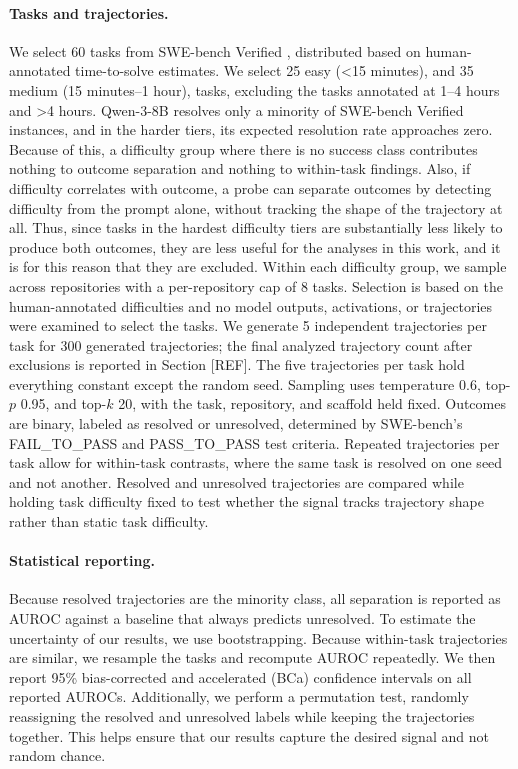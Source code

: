 \paragraph{Tasks and trajectories.} We select 60 tasks from SWE-bench Verified \citep{jimenez2024swebench}, distributed based on human-annotated time-to-solve estimates. We select 25 easy (<15 minutes), and 35 medium (15 minutes--1 hour), tasks,  excluding the tasks annotated at 1--4 hours and >4 hours. Qwen-3-8B resolves only a minority of SWE-bench Verified instances, and in the harder tiers, its expected resolution rate approaches zero. Because of this, a difficulty group where there is no success class contributes nothing to outcome separation and nothing to within-task findings. Also, if difficulty correlates with outcome, a probe can separate outcomes by detecting difficulty from the prompt alone, without tracking the shape of the trajectory at all. Thus, since tasks in the hardest difficulty tiers are substantially less likely to produce both outcomes, they are less useful for the analyses in this work, and it is for this reason that they are excluded. Within each difficulty group, we sample across repositories with a per-repository cap of 8 tasks. Selection is based on the human-annotated difficulties and no model outputs, activations, or trajectories were examined to select the tasks. We generate 5 independent trajectories per task for 300 generated trajectories; the final analyzed trajectory count after exclusions is reported in Section [REF]. The five trajectories per task hold everything constant except the random seed. Sampling uses temperature 0.6, top-$p$ 0.95, and top-$k$ 20, with the task, repository, and scaffold held fixed. Outcomes are binary, labeled as resolved or unresolved, determined by SWE-bench's FAIL\_TO\_PASS and PASS\_TO\_PASS test criteria. Repeated trajectories per task allow for within-task contrasts, where the same task is resolved on one seed and not another. Resolved and unresolved trajectories are compared while holding task difficulty fixed to test whether the signal tracks trajectory shape rather than static task difficulty.


\paragraph{Statistical reporting.} Because resolved trajectories are the minority class, all separation is reported as AUROC against a baseline that always predicts unresolved. To estimate the uncertainty of our results, we use bootstrapping. Because within-task trajectories are similar, we resample the tasks and recompute AUROC repeatedly. We then report 95\% bias-corrected and accelerated (BCa) confidence intervals on all reported AUROCs. Additionally, we perform a permutation test, randomly reassigning the resolved and unresolved labels while keeping the trajectories together. This helps ensure that our results capture the desired signal and not random chance.